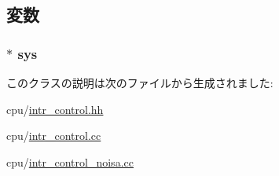 \subsection{変数}
\hypertarget{classIntrControl_a8ae37465ba84acfef6af3e9b9e6dbbd5}{
\subsubsection[{sys}]{$\ast$ {\bf sys}}}
\label{classIntrControl_a8ae37465ba84acfef6af3e9b9e6dbbd5}


このクラスの説明は次のファイルから生成されました:\begin{DoxyCompactItemize}
\item 
cpu/\hyperlink{intr__control_8hh}{intr\_\-control.hh}\item 
cpu/\hyperlink{intr__control_8cc}{intr\_\-control.cc}\item 
cpu/\hyperlink{intr__control__noisa_8cc}{intr\_\-control\_\-noisa.cc}\end{DoxyCompactItemize}
